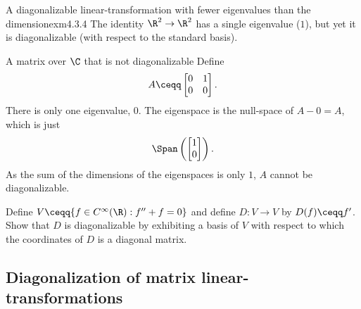 \begin{exm}{A diagonalizable linear-transformation with fewer eigenvalues than the dimension}{exm4.3.4}
	The identity $\R ^2\rightarrow \R ^2$ has a single eigenvalue ($1$), but yet it is diagonalizable (with respect to the standard basis).
\end{exm}
\begin{exm}{A matrix over $\C$ that is not diagonalizable}{}
	Define
	\begin{equation}
		A\ceqq \begin{bmatrix}0 & 1 \\ 0 & 0\end{bmatrix}.
	\end{equation}
	There is only one eigenvalue, $0$.  The eigenspace is the null-space of $A-0=A$, which is just
	\begin{equation}
		\Span \left( \begin{bmatrix}1 \\ 0\end{bmatrix}\right) .
	\end{equation}
	As the sum of the dimensions of the eigenspaces is only $1$, $A$ cannot be diagonalizable.
\end{exm}
\begin{exr}{}{}
	Define $V\ceqq \{ f\in C^{\infty}(\R ):f''+f=0\}$ and define $D\colon V\rightarrow V$ by $D(f)\ceqq f'$.  Show that $D$ is diagonalizable by exhibiting a basis of $V$ with respect to which the coordinates of $D$ is a diagonal matrix.
\end{exr}

\subsection{Diagonalization of matrix linear-transformations}

